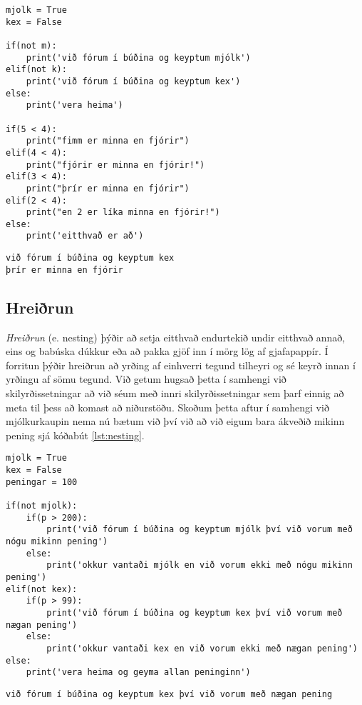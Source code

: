 \begin{lstlisting}[caption=elif notað, label=lst:elif]
mjolk = True 
kex = False 

if(not m):
	print('við fórum í búðina og keyptum mjólk')
elif(not k):
	print('við fórum í búðina og keyptum kex')
else:
	print('vera heima')

if(5 < 4):
	print("fimm er minna en fjórir")
elif(4 < 4):
	print("fjórir er minna en fjórir!")
elif(3 < 4):
	print("þrír er minna en fjórir")
elif(2 < 4):
	print("en 2 er líka minna en fjórir!")
else:
	print('eitthvað er að')
\end{lstlisting}
\lstset{style=uttak}
\begin{lstlisting}
við fórum í búðina og keyptum kex
þrír er minna en fjórir
\end{lstlisting}
\lstset{style=venjulegt}


\subsection{Hreiðrun}\label{uk:hreiðrun}
\emph{Hreiðrun} (e. nesting) þýðir að setja eitthvað endurtekið undir eitthvað annað, eins og babúska dúkkur eða að pakka gjöf inn í mörg lög af gjafapappír.
Í forritun þýðir hreiðrun að yrðing af einhverri tegund tilheyri og sé keyrð innan í yrðingu af sömu tegund.
Við getum hugsað þetta í samhengi við skilyrðissetningar að við séum með innri skilyrðissetningar sem þarf einnig að meta til þess að komast að niðurstöðu.
Skoðum þetta aftur í samhengi við mjólkurkaupin nema nú bætum við því við að við eigum bara ákveðið mikinn pening sjá kóðabút \ref{lst:nesting}.

\begin{lstlisting}[caption=Hreiðrun, label=lst:nesting]
mjolk = True 
kex = False 
peningar = 100 

if(not mjolk):
	if(p > 200):
		print('við fórum í búðina og keyptum mjólk því við vorum með nógu mikinn pening')
	else:
		print('okkur vantaði mjólk en við vorum ekki með nógu mikinn pening')
elif(not kex):
	if(p > 99):
		print('við fórum í búðina og keyptum kex því við vorum með nægan pening')
	else:
		print('okkur vantaði kex en við vorum ekki með nægan pening')
else:
	print('vera heima og geyma allan peninginn')
\end{lstlisting}
\lstset{style=uttak}
\begin{lstlisting}
við fórum í búðina og keyptum kex því við vorum með nægan pening
\end{lstlisting}
\lstset{style=venjulegt}

